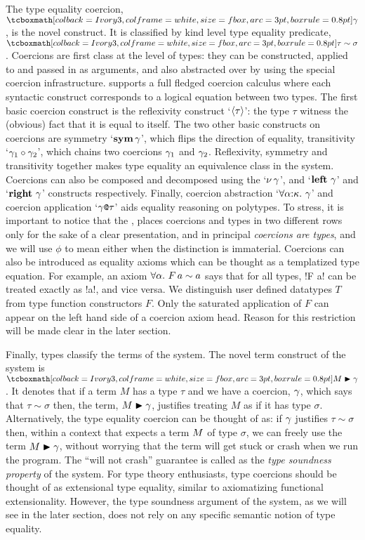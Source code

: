 \documentclass[screen,nonacm,manuscript,review]{acmart} %
\begin{document}
The type equality coercion, $\shl{\Co}$, is the novel construct.
It is classified by kind level type equality predicate,
$\shl{\tau\sim\sigma}$. Coercions are first class at the level of types:
they can be constructed, applied to and passed in as arguments, and also
abstracted over by using the special coercion infrastructure.
\SFC supports a full fledged coercion calculus where
each syntactic construct corresponds to a logical equation between two
types. The first basic coercion construct is the
reflexivity construct `$\langle{\tau}\rangle$': the type $\tau$
witness the (obvious) fact that it is equal to itself. The two other
basic constructs on coercions are symmetry `$\textbf{sym}\,{\gamma}$', which flips
the direction of equality, transitivity `${\gamma_1} \circ {\gamma_2}$',
which chains two coercions $\gamma_1$ and $\gamma_2$. Reflexivity, symmetry
and transitivity together makes type equality an equivalence class in the
system. Coercions can also be composed and decomposed using the
`$\nu\,\gamma$', and `$\textbf{left}~\gamma$' and `$\textbf{right}~\gamma$' constructs
respectively. Finally, coercion abstraction `$\forall\alpha{:}\kappa.~\gamma$' and coercion application `$\gamma\texttt{@}\tau$' aids
equality reasoning on polytypes. To stress, it is important to notice
that the , places coercions and types in two
different rows only for the sake of a clear presentation, and in
principal \emph{coercions are types}, and we will use $\phi$ to mean
either when the distinction is immaterial. Coercions can also
be introduced as equality axioms which can be thought as a templatized type
equation. For example, an axiom $\forall\alpha.~F\, a \sim a$
says that for all types, !F a! can be treated exactly as !a!, and vice
versa. We distinguish user defined datatypes $T$ from type function constructors
$F$. Only the saturated application of $F$ can appear on the left hand
side of a coercion axiom head. Reason for this restriction will be
made clear in the later section.

Finally, types classify the terms of the system.
The novel term construct of the system is $\shl{\Cast \Tm \Co}$.
It denotes that if a term $M$ has a type $\tau$
and we have a coercion, $\gamma$, which says that $\tau\sim\sigma$
then, the term, $M\mathrel{\blacktriangleright}\gamma$, justifies treating $M$ as if it has type
$\sigma$. Alternatively, the type equality coercion can be thought of
as: if $\gamma$ justifies $\tau \sim \sigma$ then, within a context that
expects a term $M$ of type $\sigma$, we can freely use the term $M\mathrel{\blacktriangleright}\gamma$,
without worrying that the term will get stuck or crash when we run the
program. The ``will not crash'' guarantee is called as the \emph{type
  soundness property} of the system.
For type theory enthusiasts, type coercions should be
thought of as extensional type equality, similar to axiomatizing functional
extensionality. However, the type soundness argument of the system, as we
will see in the later section, does not rely on any specific
semantic notion of type equality.
\end{document}
